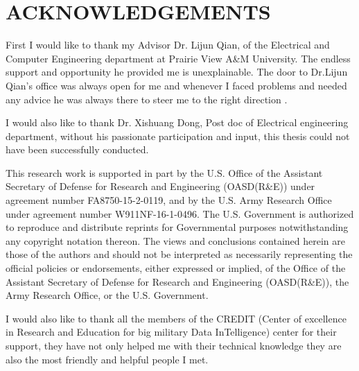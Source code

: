 %
%
%


\setlength{\parindent}{1.5em}
\chapter*{ACKNOWLEDGEMENTS}
\thispagestyle{plain} %
First I would like to thank my Advisor Dr. Lijun Qian, of the Electrical and Computer Engineering department at Prairie View A\&M University. The endless support and opportunity he provided me is unexplainable. The door to Dr.Lijun Qian's  office was always open for me and whenever I faced problems and needed any advice he was always there to steer me to the right direction .

I would also like to thank Dr. Xishuang Dong, Post doc of Electrical engineering department, without his passionate participation and input, this thesis could not have been successfully conducted. 

This research work is supported in part by the U.S. Office of the Assistant Secretary of Defense for Research and Engineering (OASD(R\&E)) under agreement number FA8750-15-2-0119, and by the U.S. Army Research Office under agreement number W911NF-16-1-0496. The U.S. Government is authorized to reproduce and distribute reprints for Governmental purposes notwithstanding any copyright notation thereon. The views and conclusions contained herein are those of the authors and should not be interpreted as necessarily representing the official policies or endorsements, either expressed or implied, of the Office of the Assistant Secretary of Defense for Research and Engineering (OASD(R\&E)), the Army Research Office, or the U.S. Government.

I would also like to thank all the members of the CREDIT (Center of excellence in Research and Education for big military Data InTelligence) center for their support, they have not only helped me with their technical knowledge they are also the most friendly and helpful people I met. 

